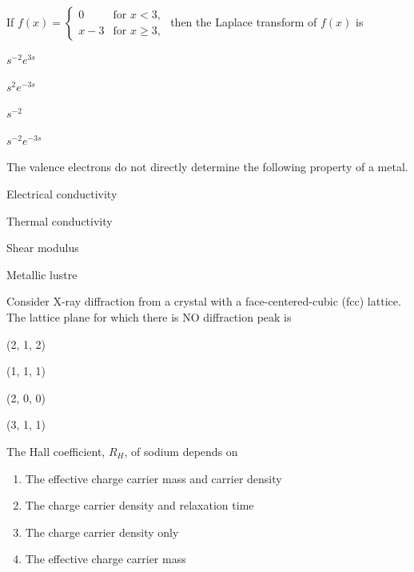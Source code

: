 \documentclass{exam}
\begin{document}
\begin{questions}
\question If $f(x)=\begin{cases}0& \text{for } x<3, \\ x-3& \text{for } x\ge3, \end{cases}$ then the Laplace transform of $f(x)$ is\hfill{}

\begin{enumerate} \begin{multicols}{4}
	\item $s^{-2}e^{3s}$ \item $s^{2}e^{-3s}$ \item $s^{-2}$ \item $s^{-2}e^{-3s}$
\end{multicols} \end{enumerate}

\question The valence electrons do not directly determine the following property of a metal.\hfill{}

\begin{enumerate}
\begin{multicols}{2}
\item Electrical conductivity
\item Thermal conductivity
\item Shear modulus
\item Metallic lustre
\end{multicols}
\end{enumerate}

\question Consider X-ray diffraction from a crystal with a face-centered-cubic (fcc) lattice. The lattice plane for which there is NO diffraction peak is\hfill{}

\begin{enumerate} \begin{multicols}{4}
	\item (2, 1, 2) \item (1, 1, 1) \item (2, 0, 0) \item (3, 1, 1)
\end{multicols} \end{enumerate}

\question The Hall coefficient, $R_H$, of sodium depends on\hfill{}

\begin{enumerate}
\item The effective charge carrier mass and carrier density
\item The charge carrier density and relaxation time
\item The charge carrier density only
\item The effective charge carrier mass
\end{enumerate}


\end{questions}
\end{document}
